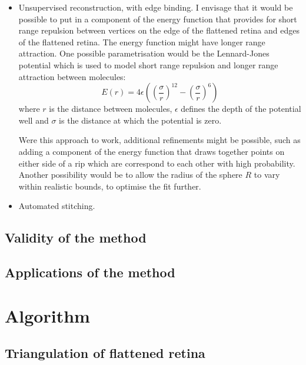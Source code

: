 \documentclass{article}
\begin{document}
\begin{itemize}
\item Unsupervised reconstruction, with edge binding.  I envisage that
  it would be possible to put in a component of the energy function
  that provides for short range repulsion between vertices on the edge
  of the flattened retina and edges of the flattened retina. The
  energy function might have longer range attraction. One possible
  parametrisation would be the Lennard-Jones potential which is used
  to model short range repulsion and longer range attraction between
  molecules:
  \begin{equation}
    \label{fold-sphere:eq:4}
    E(r) = 4\epsilon\left(\left(\frac{\sigma}{r}\right)^{12}-
      \left(\frac{\sigma}{r}\right)^{6}\right)
  \end{equation}
  where $r$ is the distance between molecules, $\epsilon$ defines the
  depth of the potential well and $\sigma$ is the distance at which the
  potential is zero.

  Were this approach to work, additional refinements might be possible,
  such as adding a component of the energy function that draws together
  points on either side of a rip which are correspond to each other with
  high probability. Another possibility would be to allow the radius of
  the sphere $R$ to vary within realistic bounds, to optimise the fit
  further.
\item Automated stitching.
\end{itemize}

\subsection{Validity of the method}
\label{fold-sphere:sec:validity-method}


\subsection{Applications of the method}
\label{fold-sphere:sec:applications-method}


\section{Algorithm}
\label{fold-retina:sec:method}



\subsection{Triangulation of flattened retina}
\label{fold-sphere:sec:triang-flatt-retina}
\end{document}
